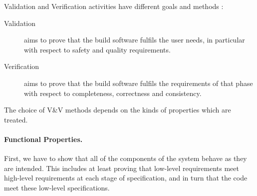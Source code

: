 \documentclass{template/openetcs_article}
\begin{document}
 


Validation and Verification activities have different goals and methods :
\begin{description}
\item [Validation] aims to prove that the build software fulfils the user needs, in particular with respect to safety and quality requirements.
\item [Verification] aims to prove that the build software fulfils the requirements of that
phase with respect to completeness, correctness and consistency.
\end{description}



The choice of V\&V methods depends on the kinds of properties which are treated.




\paragraph{Functional Properties.}

First, we have to show that all of the components of the system behave
as they are intended. This includes at least proving that low-level requirements meet
high-level requirements at each stage of specification, and in turn that the code meet these low-level
specifications. 
\end{document}
